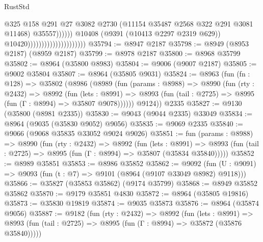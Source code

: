 \begin{lexlean}{RustStd}
\begin{coremodule}
                                                          @325
                                                          @158
                                                          @291
                                                          @27
                                                          @3082
                                                          @2730
                                                          (@11154
                                                            @35487
                                                            @2568
                                                            @322
                                                            @291
                                                            @3081
                                                            @11468)
                                                          @35557))))))
                                              @10408
                                              (@9391 (@10413 @2297 @2319 @629))
                                              @10420)))))))))))))))))))))
@35794 := @8947 @2187
@35798 := @8949 (@8953 @2187) (@8959 @2187)
@35799 := @8978 @2187
@35800 := @8968 @35799
@35802 := @8964 (@35800 @8983)
@35804 := @9006 (@9007 @2187)
@35805 := @9002 @35804
@35807 := @8964 (@35805 @9031)
@35824 := @8963
    (fun (fn : @128) =>
    @35802
      (@8986
        (@8989
          (fun (params : @8988) =>
          @8990
            (fun (rty : @2432) =>
            @8992
              (fun (lets : @8991) =>
              @8993 (fun (tail : @2725) => @8995 (fun (Γ : @8994) => @35807 @9078))))))
        @9124))
    @2335
@35827 := @9130 (@35800 (@8981 @2335))
@35830 := @9043 (@9044 @2335) @33049
@35834 := @8964 (@9035 (@35830 @9052) @9056)
@35835 := @9069 @2335
@35840 := @9066 (@9068 @35835 @33052 @9024 @9026)
@35851 := fun (params : @8988) =>
  @8990
    (fun (rty : @2432) =>
    @8992
      (fun (lets : @8991) =>
      @8993 (fun (tail : @2725) => @8995 (fun (Γ : @8994) => @35807 (@35834 @35840)))))
@35852 := @8989 @35851
@35853 := @8986 @35852
@35862 := @9092
    (fun (U : @9091) => @9093 (fun (t : @7) => @9101 (@8964 (@9107 @33049 @8982) @9118)))
@35866 := @35827 (@35853 @35862) (@9174 @35799)
@35868 := @8949 @35852 @35862
@35870 := @9179 @35851 @4830
@35872 := @8964 (@35805 @19816)
@35873 := @35830 @19819
@35874 := @9035 @35873
@35876 := @8964 (@35874 @9056)
@35887 := @9182
    (fun (rty : @2432) =>
    @8992
      (fun (lets : @8991) =>
      @8993 (fun (tail : @2725) => @8995 (fun (Γ : @8994) => @35872 (@35876 @35840)))))

\end{coremodule}
\end{lexlean}
